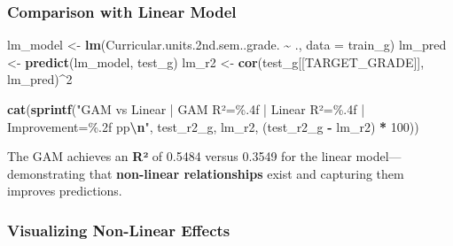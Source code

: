 \documentclass[
]{article}
\newenvironment{Shaded}{\begin{snugshade}}{\end{snugshade}}
\newcommand{\AttributeTok}[1]{\textcolor[rgb]{0.13,0.29,0.53}{#1}}
\newcommand{\DecValTok}[1]{\textcolor[rgb]{0.00,0.00,0.81}{#1}}
\newcommand{\FloatTok}[1]{\textcolor[rgb]{0.00,0.00,0.81}{#1}}
\newcommand{\FunctionTok}[1]{\textcolor[rgb]{0.13,0.29,0.53}{\textbf{#1}}}
\newcommand{\NormalTok}[1]{#1}
\newcommand{\OtherTok}[1]{\textcolor[rgb]{0.56,0.35,0.01}{#1}}
\newcommand{\SpecialCharTok}[1]{\textcolor[rgb]{0.81,0.36,0.00}{\textbf{#1}}}
\newcommand{\StringTok}[1]{\textcolor[rgb]{0.31,0.60,0.02}{#1}}
\begin{document}
\subsubsection{Comparison with Linear
Model}\label{comparison-with-linear-model}

\begin{Shaded}
\begin{Highlighting}[]
\NormalTok{lm\_model }\OtherTok{\textless{}{-}} \FunctionTok{lm}\NormalTok{(Curricular.units}\FloatTok{.2}\NormalTok{nd.sem..grade. }\SpecialCharTok{\textasciitilde{}}\NormalTok{ ., }\AttributeTok{data =}\NormalTok{ train\_g)}
\NormalTok{lm\_pred }\OtherTok{\textless{}{-}} \FunctionTok{predict}\NormalTok{(lm\_model, test\_g)}
\NormalTok{lm\_r2 }\OtherTok{\textless{}{-}} \FunctionTok{cor}\NormalTok{(test\_g[[TARGET\_GRADE]], lm\_pred)}\SpecialCharTok{\^{}}\DecValTok{2}

\FunctionTok{cat}\NormalTok{(}\FunctionTok{sprintf}\NormalTok{(}\StringTok{"GAM vs Linear | GAM R²=\%.4f | Linear R²=\%.4f | Improvement=\%.2f pp}\SpecialCharTok{\textbackslash{}n}\StringTok{"}\NormalTok{,}
\NormalTok{            test\_r2\_g, lm\_r2, (test\_r2\_g }\SpecialCharTok{{-}}\NormalTok{ lm\_r2) }\SpecialCharTok{*} \DecValTok{100}\NormalTok{))}
\end{Highlighting}
\end{Shaded}

The GAM achieves an \textbf{R²} of 0.5484 versus 0.3549 for the linear
model---demonstrating that \textbf{non-linear relationships} exist and
capturing them improves predictions.

\subsubsection{Visualizing Non-Linear
Effects}\label{visualizing-non-linear-effects}
\end{document}
